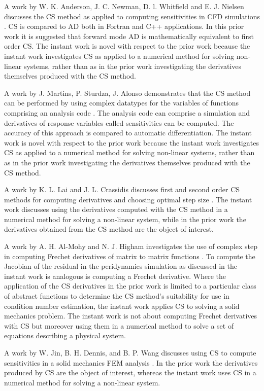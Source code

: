 \documentclass[preprint,12pt]{elsarticle}
\begin{document}
A work by W. K. Anderson, J. C. Newman, D. l. Whitfield and E. J. Nielsen
discusses the CS method as applied to computing sensitivities in CFD simulations
\cite{anderson2001sensitivity}. CS is compared to AD both in Fortran and C++
applications. In this prior work it is suggested that forward mode AD is
mathematically equivalent to first order CS. The instant work is novel with
respect to the prior work because the instant work investigates CS as applied
to a numerical method for solving non-linear systems, rather than as in the
prior work investigating the derivatives themselves produced with the CS
method.

A work by J. Martins, P. Sturdza, J. Alonso demonstrates that the CS method can
be performed by using complex datatypes for the variables of functions
comprising an analysis code \cite{martins2003complex}. The analysis code can
comprise a simulation and derivatives of response variables called
sensitivities can be computed. The accuracy of this approach is compared to
automatic differentiation. The instant work is novel with respect to the prior
work because the instant work investigates CS as applied to a numerical method
for solving non-linear systems, rather than as in the prior work investigating
the derivatives themselves produced with the CS method.
 
A work by  K. L. Lai and J. L. Crassidis discusses first and second order CS
methods for computing derivatives and choosing optimal step size
\cite{lai2008extensions}. The instant work discusses using the derivatives
computed with the CS method in a numerical method for solving a non-linear
system, while in the prior work the derivatives obtained from the CS method 
are the object of interest.

A work by A. H. Al-Mohy and N. J. Higham investigates the use of complex step
in computing Frechet derivatives of matrix to matrix functions
\cite{al2010complex}. To compute the Jacobian of the residual in the
peridynamics simulation as discussed in the instant work is analogous is
computing a Frechet derivative. Where the application of the CS derivatives in
the prior work is limited to a particular class of abstract functions to
determine the CS method's suitability for use in condition number estimation, the
instant work applies CS to solving a solid mechanics problem. The instant work is not
about computing Frechet derivatives with CS but moreover using them in a
numerical method to solve a set of equations describing a physical system.

A work by W. Jin, B. H. Dennis, and B. P. Wang discusses using CS to compute
sensitivities in a solid mechanics FEM analysis \cite{jin2010improved}. In the
prior work the derivatives produced by CS are the object of
interest, whereas the instant work uses CS in a numerical method for solving a
non-linear system.
\end{document}
